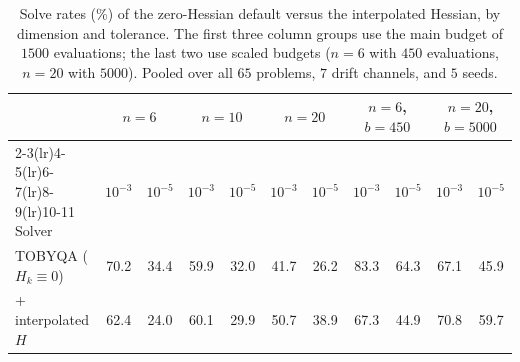 \begin{table}[t]
\centering\footnotesize
\setlength{\tabcolsep}{3pt}
\caption{Solve rates (\%) of the zero-Hessian default versus the interpolated Hessian, by dimension and tolerance. The first three column groups use the main budget of $1500$ evaluations; the last two use scaled budgets ($n=6$ with $450$ evaluations, $n=20$ with $5000$). Pooled over all $65$ problems, $7$ drift channels, and $5$ seeds.}
\label{tab:hessian}
\begin{tabular}{l cc cc cc cc cc}
\toprule
& \multicolumn{2}{c}{$n=6$} & \multicolumn{2}{c}{$n=10$} & \multicolumn{2}{c}{$n=20$} & \multicolumn{2}{c}{$n=6$, $b=450$} & \multicolumn{2}{c}{$n=20$, $b=5000$} \\
\cmidrule(lr){2-3}\cmidrule(lr){4-5}\cmidrule(lr){6-7}\cmidrule(lr){8-9}\cmidrule(lr){10-11}
Solver & $10^{-3}$ & $10^{-5}$ & $10^{-3}$ & $10^{-5}$ & $10^{-3}$ & $10^{-5}$ & $10^{-3}$ & $10^{-5}$ & $10^{-3}$ & $10^{-5}$ \\
\midrule
TOBYQA ($H_k \equiv 0$) & 70.2 & 34.4 & 59.9 & 32.0 & 41.7 & 26.2 & 83.3 & 64.3 & 67.1 & 45.9 \\
\quad + interpolated $H$ & 62.4 & 24.0 & 60.1 & 29.9 & 50.7 & 38.9 & 67.3 & 44.9 & 70.8 & 59.7 \\
\bottomrule
\end{tabular}
\end{table}
